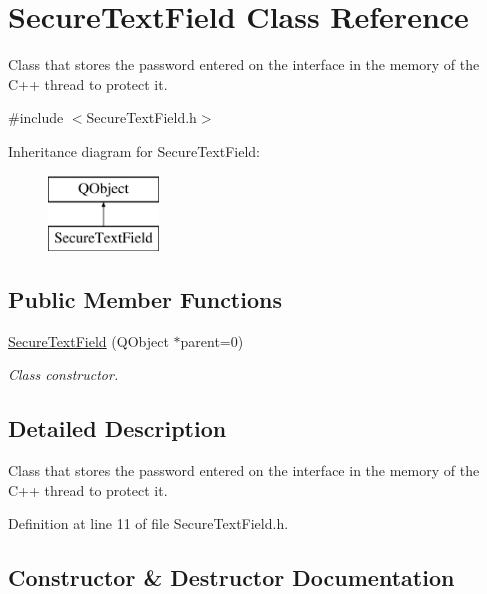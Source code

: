 \hypertarget{class_secure_text_field}{}\section{Secure\+Text\+Field Class Reference}
\label{class_secure_text_field}


Class that stores the password entered on the interface in the memory of the C++ thread to protect it.  




{\ttfamily \#include $<$Secure\+Text\+Field.\+h$>$}

Inheritance diagram for Secure\+Text\+Field\+:\begin{figure}[H]
\begin{center}
\leavevmode
\includegraphics[height=2.000000cm]{class_secure_text_field}
\end{center}
\end{figure}
\subsection*{Public Member Functions}
\begin{DoxyCompactItemize}
\item 
\hyperlink{class_secure_text_field_ad61c2549682eebfb19542280028a146c}{Secure\+Text\+Field} (Q\+Object $\ast$parent=0)
\begin{DoxyCompactList}\small\item\em Class constructor. \end{DoxyCompactList}\end{DoxyCompactItemize}


\subsection{Detailed Description}
Class that stores the password entered on the interface in the memory of the C++ thread to protect it. 

Definition at line 11 of file Secure\+Text\+Field.\+h.



\subsection{Constructor \& Destructor Documentation}
\mbox{\label{class_secure_text_field_ad61c2549682eebfb19542280028a146c}} 
